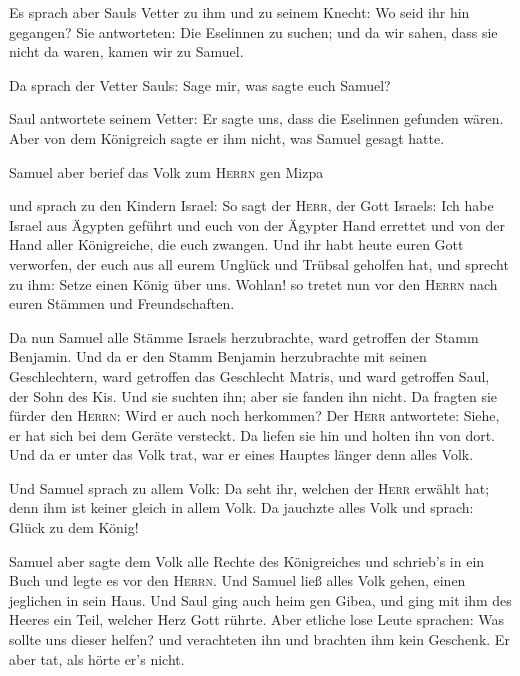  Es sprach aber Sauls Vetter zu ihm und zu seinem Knecht:
Wo seid ihr hin gegangen? Sie antworteten: Die Eselinnen zu suchen; und
da wir sahen, dass sie nicht da waren, kamen wir zu Samuel.

 Da sprach der Vetter Sauls: Sage mir, was sagte euch
Samuel?

 Saul antwortete seinem Vetter: Er sagte uns, dass die
Eselinnen gefunden wären. Aber von dem Königreich sagte er ihm nicht,
was Samuel gesagt hatte.

 Samuel aber berief das Volk zum \textsc{Herrn} gen Mizpa

 und sprach zu den Kindern Israel: So sagt der
\textsc{Herr}, der Gott Israels: Ich habe Israel aus Ägypten geführt und
euch von der Ägypter Hand errettet und von der Hand aller Königreiche,
die euch zwangen.  Und ihr habt heute euren Gott
verworfen, der euch aus all eurem Unglück und Trübsal geholfen hat, und
sprecht zu ihm: Setze einen König über uns. Wohlan! so tretet nun vor
den \textsc{Herrn} nach euren Stämmen und Freundschaften.

 Da nun Samuel alle Stämme Israels herzubrachte, ward
getroffen der Stamm Benjamin.  Und da er den Stamm
Benjamin herzubrachte mit seinen Geschlechtern, ward getroffen das
Geschlecht Matris, und ward getroffen Saul, der Sohn des Kis. Und sie
suchten ihn; aber sie fanden ihn nicht.  Da fragten sie
fürder den \textsc{Herrn}: Wird er auch noch herkommen? Der
\textsc{Herr} antwortete: Siehe, er hat sich bei dem Geräte versteckt.
 Da liefen sie hin und holten ihn von dort. Und da er
unter das Volk trat, war er eines Hauptes länger denn alles Volk.

 Und Samuel sprach zu allem Volk: Da seht ihr, welchen
der \textsc{Herr} erwählt hat; denn ihm ist keiner gleich in allem Volk.
Da jauchzte alles Volk und sprach: Glück zu dem König!

 Samuel aber sagte dem Volk alle Rechte des Königreiches
und schrieb's in ein Buch und legte es vor den \textsc{Herrn}. Und
Samuel ließ alles Volk gehen, einen jeglichen in sein Haus.
 Und Saul ging auch heim gen Gibea, und ging mit ihm des
Heeres ein Teil, welcher Herz Gott rührte.  Aber etliche
lose Leute sprachen: Was sollte uns dieser helfen? und verachteten ihn
und brachten ihm kein Geschenk. Er aber tat, als hörte er's nicht.

